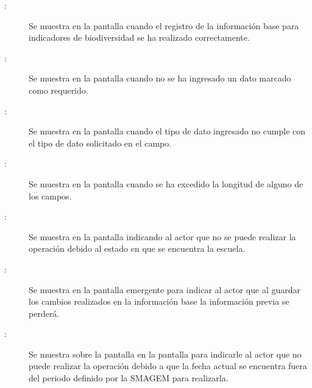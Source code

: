     \begin{description}
      
	    \item [:] Se muestra en la pantalla  cuando el registro de la información base para indicadores de biodiversidad se ha realizado correctamente.	    
	    
	    \item [:] Se muestra en la pantalla  cuando no se ha ingresado un dato marcado como requerido.
	    
	    \item [:] Se muestra en la pantalla  cuando el tipo de dato ingresado no cumple con el tipo de dato solicitado en el campo.
	    
	    \item [:] Se muestra en la pantalla  cuando se ha excedido la longitud de alguno de los campos.
	    
	    \item[:] Se muestra en la pantalla  indicando al actor que no se puede realizar la operación debido al estado en que se encuentra la escuela.
	    
	    \item [:] Se muestra en la pantalla emergente  para indicar al actor que al guardar los cambios realizados en la información base la información previa se perderá.  
	    
	    \item [:] Se muestra sobre la pantalla en la pantalla  para indicarle al actor que no puede realizar la operación debido a que la fecha actual se encuentra fuera del periodo definido por la SMAGEM para realizarla.
    \end{description}
